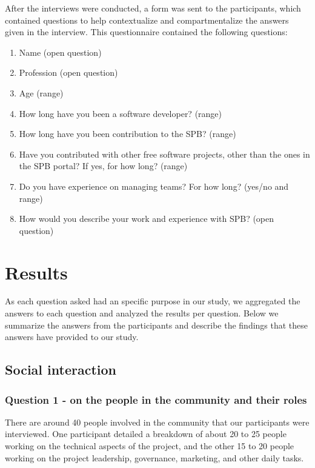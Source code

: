 \documentclass{sigchi}
\begin{document}
After the interviews were conducted, a form was sent to the participants, which contained questions to help contextualize and compartmentalize the answers given in the interview. This questionnaire contained the following questions:

\begin{enumerate}
  \item Name (open question)
  \item Profession (open question)
  \item Age (range)
  \item How long have you been a software developer? (range)
  \item How long have you been contribution to the SPB? (range)
  \item Have you contributed with other free software projects, other than the ones in the SPB portal? If yes, for how long? (range)
  \item Do you have experience on managing teams? For how long? (yes/no and range)
  \item How would you describe your work and experience with SPB? (open question) 
\end{enumerate}


%
%
%
%
\section{Results}

As each question asked had an specific purpose in our study, we aggregated the answers to each question and analyzed the results per question. Below we summarize the answers from the participants and describe the findings that these answers have provided to our study.

\subsection{Social interaction}

\subsubsection{Question 1 - on the people in the community and their roles}

There are around 40 people involved in the community that our participants were interviewed. One participant detailed a breakdown of about 20 to 25 people working on the technical aspects of the project, and the other 15 to 20 people working on the project leadership, governance, marketing, and other daily tasks.
\end{document}
